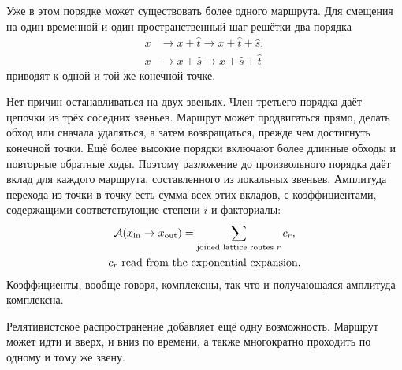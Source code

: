 Уже в этом порядке может существовать более одного маршрута. Для смещения на один временной и один пространственный шаг решётки два порядка
\begin{align}
x
&\longrightarrow x+\hat t
\longrightarrow x+\hat t+\hat s,\\
x
&\longrightarrow x+\hat s
\longrightarrow x+\hat s+\hat t
\end{align}
приводят к одной и той же конечной точке.

\begin{classroomqa}
\end{classroomqa}

Нет причин останавливаться на двух звеньях. Член третьего порядка даёт цепочки из трёх соседних звеньев. Маршрут может продвигаться прямо, делать обход или сначала удаляться, а затем возвращаться, прежде чем достигнуть конечной точки. Ещё более высокие порядки включают более длинные обходы и повторные обратные ходы. Поэтому разложение до произвольного порядка даёт вклад для каждого маршрута, составленного из локальных звеньев. Амплитуда перехода из точки в точку есть сумма всех этих вкладов, с коэффициентами, содержащими соответствующие степени \(i\) и факториалы:
\begin{equation}
\begin{gathered}
\mathcal{A}(x_{\mathrm{in}}\to x_{\mathrm{out}})
=
\sum_{\text{joined lattice routes }r}c_r,
\\
c_r\ \hbox{read from the exponential expansion}.
\end{gathered}
\end{equation}
Коэффициенты, вообще говоря, комплексны, так что и получающаяся амплитуда комплексна.

Релятивистское распространение добавляет ещё одну возможность. Маршрут может идти и вверх, и вниз по времени, а также многократно проходить по одному и тому же звену.

\begin{classroomqa}
\end{classroomqa}

